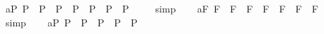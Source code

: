 \begin{isabellebody}
\ a{}{}{\isacharunderscore}{}{\isacharunderscore}P{\isacharcolon}\ {\isachardoublequoteopen}{\isacharbrackleft}{\isacharparenleft}{\isasymphi}\isactrlsup P\ \isactrlbold {\isasymrightarrow}\ {\isacharparenleft}{\isasympsi}\isactrlsup P\ \isactrlbold {\isasymrightarrow}\ {\isasymchi}\isactrlsup P{\isacharparenright}{\isacharparenright}\ \isactrlbold {\isasymrightarrow}\ {\isacharparenleft}{\isacharparenleft}{\isasymphi}\isactrlsup P\ \isactrlbold {\isasymrightarrow}\ {\isasympsi}\isactrlsup P{\isacharparenright}\ \isactrlbold {\isasymrightarrow}\ {\isacharparenleft}{\isasymphi}\isactrlsup P\ \isactrlbold {\isasymrightarrow}\ {\isasymchi}\isactrlsup P{\isacharparenright}{\isacharparenright}{\isacharbrackright}\ {\isacharequal}\ {\isasymtop}{\isachardoublequoteclose}%
\isadelimproof
\ %
\endisadelimproof
%
\isatagproof
{}\isamarkupfalse%
\ simp\ \isamarkupfalse%
%
\endisatagproof
{\isafoldproof}%
%
\isadelimproof
%
\endisadelimproof
\isanewline
\ \isamarkupfalse%
\ a{}{}{\isacharunderscore}{}{\isacharunderscore}F{\isacharcolon}\ {\isachardoublequoteopen}{\isacharbrackleft}{\isacharparenleft}{\isasymphi}\isactrlsup F\ \isactrlbold {\isasymrightarrow}\ {\isacharparenleft}{\isasympsi}\isactrlsup F\ \isactrlbold {\isasymrightarrow}\ {\isasymchi}\isactrlsup F{\isacharparenright}{\isacharparenright}\ \isactrlbold {\isasymrightarrow}\ {\isacharparenleft}{\isacharparenleft}{\isasymphi}\isactrlsup F\ \isactrlbold {\isasymrightarrow}\ {\isasympsi}\isactrlsup F{\isacharparenright}\ \isactrlbold {\isasymrightarrow}\ {\isacharparenleft}{\isasymphi}\isactrlsup F\ \isactrlbold {\isasymrightarrow}\ {\isasymchi}\isactrlsup F{\isacharparenright}{\isacharparenright}{\isacharbrackright}\ {\isacharequal}\ {\isasymtop}{\isachardoublequoteclose}%
\isadelimproof
\ %
\endisadelimproof
%
\isatagproof
{}\isamarkupfalse%
\ simp\ \isamarkupfalse%
%
\endisatagproof
{\isafoldproof}%
%
\isadelimproof
%
\endisadelimproof
\isanewline
\ \isamarkupfalse%
\ a{}{}{\isacharunderscore}{}{\isacharunderscore}P{\isacharcolon}\ {\isachardoublequoteopen}{\isacharbrackleft}{\isacharparenleft}\isactrlbold {\isasymnot}{\isasymphi}\isactrlsup P\ \isactrlbold {\isasymrightarrow}\ \isactrlbold {\isasymnot}{\isasympsi}\isactrlsup P{\isacharparenright}\ \isactrlbold {\isasymrightarrow}\ {\isacharparenleft}{\isacharparenleft}\isactrlbold {\isasymnot}{\isasymphi}\isactrlsup P\ \isactrlbold {\isasymrightarrow}\ {\isasympsi}\isactrlsup P{\isacharparenright}\ \isactrlbold {\isasymrightarrow}\ {\isasymphi}\isactrlsup P{\isacharparenright}{\isacharbrackright}\ {\isacharequal}\ {\isasymtop}{\isachardoublequoteclose}%

\end{isabellebody}
